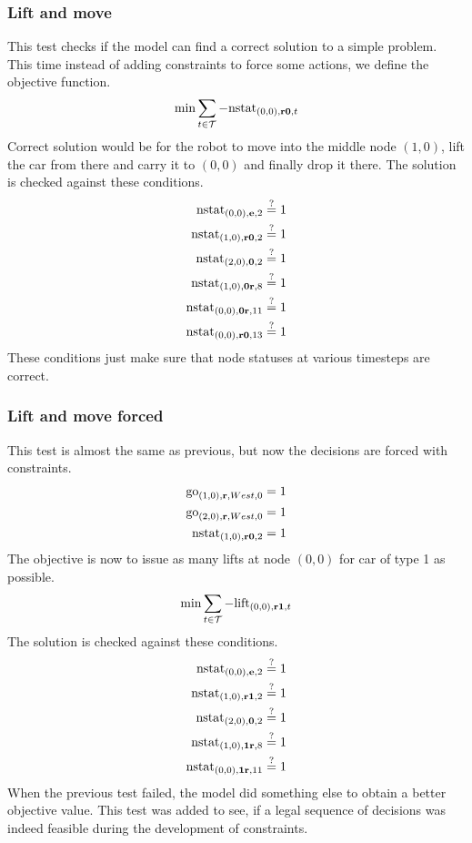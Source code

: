 \subsubsection{Lift and move}
This test checks if the model can find a correct solution to a simple problem.
This time instead of adding constraints to force some actions, we define the
objective function.
\begin{align}
    \min \sum_{t \in \mathcal{T}} -\mathrm{nstat}_{(0,0), \text{\bf r0}, t}
\end{align}
Correct solution would be for the robot to move into the middle node $(1,0)$,
lift the car from there and carry it to $(0,0)$ and finally drop it there. The
solution is checked against these conditions.
\begin{align}
    \mathrm{nstat}_{(0,0), \text{\bf e}, 2} &\overset{?}{=} 1\\
    \mathrm{nstat}_{(1,0), \text{\bf r0}, 2} &\overset{?}{=} 1\\
    \mathrm{nstat}_{(2,0), \text{\bf 0}, 2} &\overset{?}{=} 1\\
    \mathrm{nstat}_{(1,0), \text{\bf 0r}, 8} &\overset{?}{=} 1\\
    \mathrm{nstat}_{(0,0), \text{\bf 0r}, 11} &\overset{?}{=} 1\\
    \mathrm{nstat}_{(0,0), \text{\bf r0}, 13} &\overset{?}{=} 1
\end{align}
These conditions just make sure that node statuses at various timesteps are
correct.
\subsubsection{Lift and move forced}
This test is almost the same as previous, but now the decisions are forced with
constraints.
\begin{align}
    \mathrm{go}_{(1,0),\text{\bf r},West,0} &= 1\\
    \mathrm{go}_{(2,0),\text{\bf r},West,0} &= 1\\
    \mathrm{nstat}_{(1,0),\text{\bf r0},2} &= 1
\end{align}
The objective is now to issue as many lifts at node $(0,0)$ for car of type 1
as possible.
\begin{align}
    \min \sum_{t \in \mathcal{T}} -\mathrm{lift}_{(0,0), \text{\bf r1}, t}
\end{align}
The solution is checked against these conditions.
\begin{align}
    \mathrm{nstat}_{(0,0), \text{\bf e}, 2} &\overset{?}{=} 1\\
    \mathrm{nstat}_{(1,0), \text{\bf r1}, 2} &\overset{?}{=} 1\\
    \mathrm{nstat}_{(2,0), \text{\bf 0}, 2} &\overset{?}{=} 1\\
    \mathrm{nstat}_{(1,0), \text{\bf 1r}, 8} &\overset{?}{=} 1\\
    \mathrm{nstat}_{(0,0), \text{\bf 1r}, 11} &\overset{?}{=} 1
\end{align}
When the previous test failed, the model did something else to obtain a better
objective value. This test was added to see, if a legal sequence of decisions
was indeed feasible during the development of constraints.
